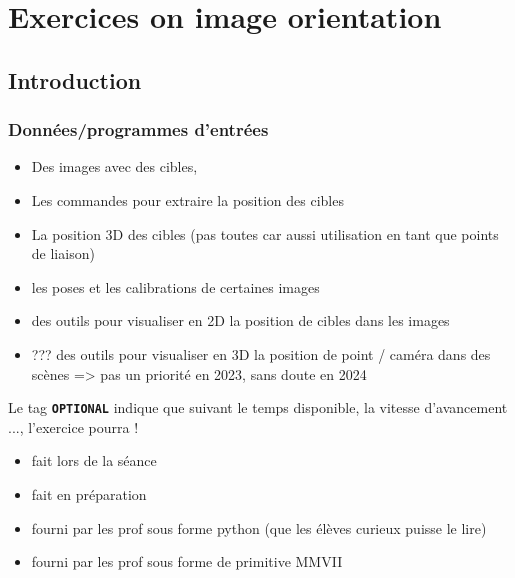 


\chapter{Exercices on image orientation}


\section{Introduction}

\subsection{Données/programmes d'entrées}

\begin{itemize}
   \item Des images avec  des cibles,  
   \item Les commandes  pour extraire la position des cibles
   \item La position 3D des cibles (pas toutes car aussi utilisation en tant que points de liaison)
   \item les poses et les calibrations de certaines images
   \item des outils pour visualiser en 2D la position de cibles dans les images
   \item  ??? des outils pour visualiser en 3D la position de point / caméra dans des scènes => pas un priorité en 2023,
	   sans doute en 2024
\end{itemize}


Le tag {\tt \bf OPTIONAL} indique que suivant le temps disponible, la vitesse d'avancement  ...,
l'exercice pourra !

\begin{itemize}
   \item fait lors de la séance
   \item fait en préparation
   \item fourni par les prof sous forme python (que les élèves curieux puisse le lire)
   \item fourni par les prof sous forme de primitive MMVII
\end{itemize}

